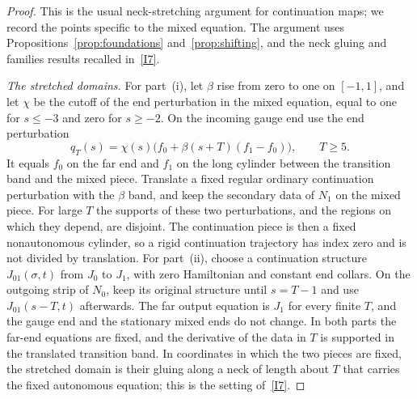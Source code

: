 \documentclass[11pt]{amsart}
\theoremstyle{definition}
\theoremstyle{remark}
\theoremstyle{plain}
\numberwithin{equation}{section}
\begin{document}
\begin{proof}
This is the usual neck-stretching argument for continuation maps; we
record the points specific to the mixed equation. The argument uses
Propositions~\ref{prop:foundations} and~\ref{prop:shifting}, and the
neck gluing and families results recalled in~\ref{I7}.

\emph{The stretched domains.} For part~(i), let $\beta$ rise from zero
to one on $[-1,1]$, and let $\chi$ be the cutoff of the end
perturbation in the mixed equation, equal to one for $s\leq-3$ and
zero for $s\geq-2$. On the incoming gauge end use the end perturbation
\[
 q_T(s)=\chi(s)\bigl(f_0+\beta(s+T)(f_1-f_0)\bigr),
 \qquad T\geq5.
\]
It equals $f_0$ on the far end and $f_1$ on the long cylinder between
the transition band and the mixed piece. Translate a fixed regular
ordinary continuation perturbation with the $\beta$ band, and keep the
secondary data of $N_1$ on the mixed piece. For large $T$ the supports
of these two perturbations, and the regions on which they depend, are
disjoint. The continuation piece is then a fixed nonautonomous
cylinder, so a rigid continuation trajectory has index zero and is not
divided by translation. For part~(ii), choose a continuation structure
$J_{01}(\sigma,t)$ from $J_0$ to $J_1$, with zero Hamiltonian and
constant end collars. On the outgoing strip of $N_0$, keep its
original structure until $s=T-1$ and use $J_{01}(s-T,t)$ afterwards.
The far output equation is $J_1$ for every finite $T$, and the gauge
end and the stationary mixed ends do not change. In both parts the
far-end equations are fixed, and the derivative of the data in $T$ is
supported in the translated transition band. In coordinates in which
the two pieces are fixed, the stretched domain is their gluing along a
neck of length about $T$ that carries the fixed autonomous equation;
this is the setting of~\ref{I7}.


\end{proof}
\end{document}
